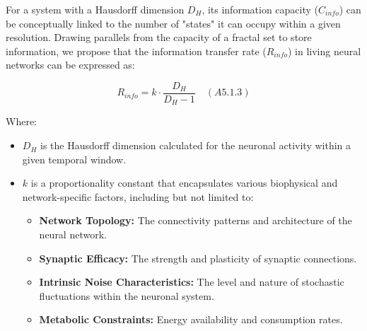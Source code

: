 \documentclass{article}
\begin{document}
\begin{enumerate}
    For a system with a Hausdorff dimension $D_H$, its information capacity ($C_{info}$) can be conceptually linked to the number of "states" it can occupy within a given resolution. Drawing parallels from the capacity of a fractal set to store information, we propose that the information transfer rate ($R_{info}$) in living neural networks can be expressed as:

    \[
    R_{info} = k \cdot \frac{D_H}{D_H - 1} \quad (A5.1.3)
    \]

    Where:
    \begin{itemize}
        \item $D_H$ is the Hausdorff dimension calculated for the neuronal activity within a given temporal window.
        \item $k$ is a proportionality constant that encapsulates various biophysical and network-specific factors, including but not limited to:
        \begin{itemize}
            \item \textbf{Network Topology:} The connectivity patterns and architecture of the neural network.
            \item \textbf{Synaptic Efficacy:} The strength and plasticity of synaptic connections.
            \item \textbf{Intrinsic Noise Characteristics:} The level and nature of stochastic fluctuations within the neuronal system.
            \item \textbf{Metabolic Constraints:} Energy availability and consumption rates.
        \end{itemize}
    \end{itemize}


\end{enumerate}
\end{document}
